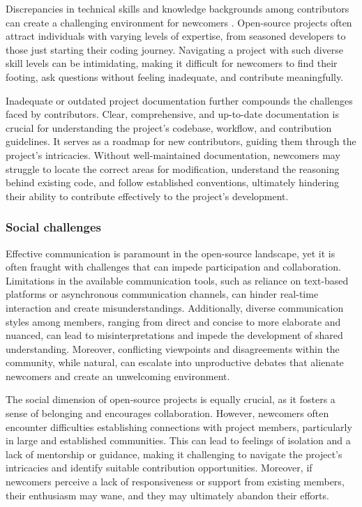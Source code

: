 Discrepancies in technical skills and knowledge backgrounds among contributors can create a challenging environment for newcomers \cite{01steinmacher2015systematic}. Open-source projects often attract individuals with varying levels of expertise, from seasoned developers to those just starting their coding journey. Navigating a project with such diverse skill levels can be intimidating, making it difficult for newcomers to find their footing, ask questions without feeling inadequate, and contribute meaningfully.

Inadequate or outdated project documentation further compounds the challenges faced by contributors. Clear, comprehensive, and up-to-date documentation is crucial for understanding the project's codebase, workflow, and contribution guidelines. It serves as a roadmap for new contributors, guiding them through the project's intricacies. Without well-maintained documentation, newcomers may struggle to locate the correct areas for modification, understand the reasoning behind existing code, and follow established conventions, ultimately hindering their ability to contribute effectively to the project's development.



\subsubsection{Social challenges}

Effective communication is paramount in the open-source landscape, yet it is often fraught with challenges that can impede participation and collaboration. Limitations in the available communication tools, such as reliance on text-based platforms or asynchronous communication channels, can hinder real-time interaction and create misunderstandings. Additionally, diverse communication styles among members, ranging from direct and concise to more elaborate and nuanced, can lead to misinterpretations and impede the development of shared understanding. Moreover, conflicting viewpoints and disagreements within the community, while natural, can escalate into unproductive debates that alienate newcomers and create an unwelcoming environment.

The social dimension of open-source projects is equally crucial, as it fosters a sense of belonging and encourages collaboration. However, newcomers often encounter difficulties establishing connections with project members, particularly in large and established communities. This can lead to feelings of isolation and a lack of mentorship or guidance, making it challenging to navigate the project's intricacies and identify suitable contribution opportunities. Moreover, if newcomers perceive a lack of responsiveness or support from existing members, their enthusiasm may wane, and they may ultimately abandon their efforts.

